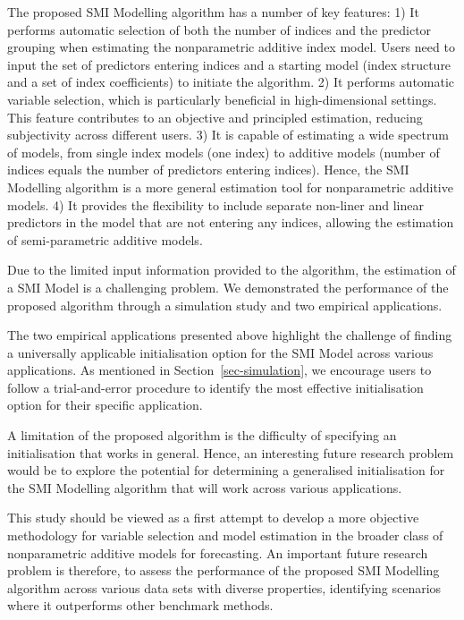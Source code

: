 \documentclass[
  11pt,
  a4paper,
]{article}
\begin{document}
The proposed SMI Modelling algorithm has a number of key features: 1) It
performs automatic selection of both the number of indices and the
predictor grouping when estimating the nonparametric additive index
model. Users need to input the set of predictors entering indices and a
starting model (index structure and a set of index coefficients) to
initiate the algorithm. 2) It performs automatic variable selection,
which is particularly beneficial in high-dimensional settings. This
feature contributes to an objective and principled estimation, reducing
subjectivity across different users. 3) It is capable of estimating a
wide spectrum of models, from single index models (one index) to
additive models (number of indices equals the number of predictors
entering indices). Hence, the SMI Modelling algorithm is a more general
estimation tool for nonparametric additive models. 4) It provides the
flexibility to include separate non-liner and linear predictors in the
model that are not entering any indices, allowing the estimation of
semi-parametric additive models.

Due to the limited input information provided to the algorithm, the
estimation of a SMI Model is a challenging problem. We demonstrated the
performance of the proposed algorithm through a simulation study and two
empirical applications.

The two empirical applications presented above highlight the challenge
of finding a universally applicable initialisation option for the SMI
Model across various applications. As mentioned in
Section~\ref{sec-simulation}, we encourage users to follow a
trial-and-error procedure to identify the most effective initialisation
option for their specific application.

A limitation of the proposed algorithm is the difficulty of specifying
an initialisation that works in general. Hence, an interesting future
research problem would be to explore the potential for determining a
generalised initialisation for the SMI Modelling algorithm that will
work across various applications.

This study should be viewed as a first attempt to develop a more
objective methodology for variable selection and model estimation in the
broader class of nonparametric additive models for forecasting. An
important future research problem is therefore, to assess the
performance of the proposed SMI Modelling algorithm across various data
sets with diverse properties, identifying scenarios where it outperforms
other benchmark methods.
\end{document}

